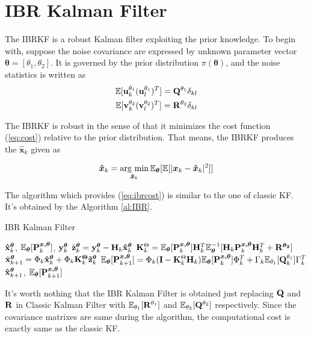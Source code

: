 \section{IBR Kalman Filter\label{sec: ibr}}

The IBRKF is a robust Kalman filter exploiting the prior knowledge. To begin with, suppose the noise covariance are expressed by unknown parameter vector $\bm{\theta}=[\theta_1, \theta_2]$. It is governed by the prior distribution $\pi(\bm{\theta})$, and the noise statistics is written as
\begin{align}
    \mathbb{E}[{\bf u}^{\theta_1}_k ({\bf u}^{\theta_1}_l)^T]={\bf Q}^{\theta_1}\delta_{kl} \\
    \mathbb{E}[{\bf v}^{\theta_2}_k ({\bf v}^{\theta_2}_l)^T]={\bf R}^{\theta_2}\delta_{kl} 
\end{align}

The IBRKF is robust in the sense of that it minimizes the cost function (\ref{eq:cost}) relative to the prior distribution. That means, the IBRKF produces the $\bm{\hat x}_k$ given as

\begin{equation} \label{eq:ibrcost}
    \bm{\hat x}_k = \mathop{\rm arg~min}\limits_{\bm{\hat x}_k}\mathbb{E}_{\bm{\theta}}[\mathbb{E}[|\bm{x}_k-\bm{\hat x}_k|^2]]
\end{equation}

The algorithm which provides (\ref{eq:ibrcost}) is similar to the one of classic KF. It's obtained by the Algorithm \ref{al:IBR}.

\begin{algorithm}[]
\caption{IBR Kalman Filter}
\begin{algorithmic}[1]
    \label{al:IBR}
\REQUIRE ${\bf \hat x}^{\bm{\theta}}_k$, $\mathbb{E}_{\bm{\theta}}[{\bf P}^{\bm{x, \theta}}_{k}]$, ${\bf y}^{\bm{\theta}}_k$
\STATE $\tilde {\bf z}^{\bm{\theta}}_k = {\bf y}^{\bm{\theta}}_k - {\bf H}_k{\bf \hat x}^{\bm{\theta}}_k$
\STATE ${\bf K}^{\Theta}_k = \mathbb{E}_{\bm{\theta}}[{\bf P}^{\bm{x, \theta}}_k]{\bf H}^T_k\mathbb{E}_{\bm{\theta}}^{-1}[{\bf H}_k{\bf P}^{\bm{x, \theta}}_k{\bf H}^T_k+{\bf R}^{\bm{\theta_2}}]$
\STATE $\hat{\bf x}^{\bm{\theta}}_{k+1} = {\Phi}_k{\bf \hat x}^{\bm{\theta}}_k+{\Phi}_k{\bf K}^{\bm{\Theta}}_k{\bf \tilde z}^{\bm{\theta}}_k$
\STATE $\mathbb{E}_{\bm\theta}[{\bf P}^{\bm{x, \theta}}_{k+1}] = {\Phi}_k({\bf I}-{\bf K}^{\Theta}_k{\bf H}_k)\mathbb{E}_{\bm\theta}[{\bf P}^{\bm{x, \theta}}_k]{\Phi}^T_k + {\Gamma}_k\mathbb{E}_{\theta_1}[{\bf Q}^{\theta_1}_k]{\Gamma}_k^T$
\ENSURE ${\bf \hat x}^{\bm{\theta}}_{k+1}$, $\mathbb{E}_{\bm\theta}[{\bf P}^{\bm{x, \theta}}_{k+1}]$
\end{algorithmic}
\end{algorithm}

It's worth nothing that the IBR Kalman Filter is obtained just replacing ${\bf Q}$ and ${\bf R}$ in Classic Kalman Filter with $\mathbb{E}_{\theta_1}[{\bf R}^{\theta_1}]$ and $\mathbb{E}_{\theta_2}[{\bf Q}^{\theta_2}]$ respectively. Since the covariance matrixes are same during the algorithm, the computational cost is exactly same as the classic KF. 
